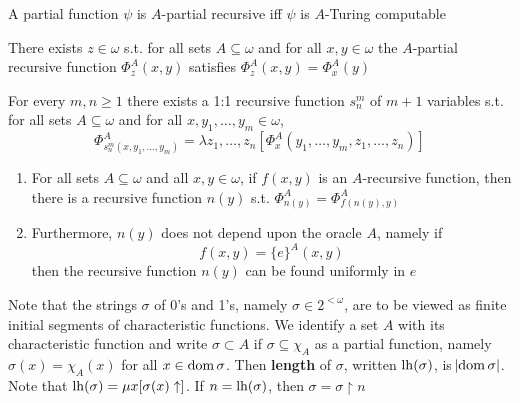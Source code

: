 \documentclass[11pt]{article}
\begin{document}
\begin{theorem}[]
A partial function \(\psi\) is \(A\)-partial recursive iff \(\psi\) is \(A\)-Turing computable
\end{theorem}

\begin{theorem}
There exists \(z\in\omega\) s.t. for all sets \(A\subseteq\omega\) and for
all \(x,y\in\omega\) the \(A\)-partial recursive function \(\Phi_z^A(x,y)\)
satisfies \(\Phi_z^A(x,y)=\Phi_x^A(y)\)
\end{theorem}

\begin{theorem}
For every \(m,n\ge1\) there exists a 1:1 recursive function \(s_n^m\) of
\(m+1\) variables s.t. for all sets \(A\subseteq\omega\) and for all
\(x,y_1,\dots,y_m\in\omega\),
\begin{equation*}
\Phi_{s^m_n(x,y_1,\dots,y_m)}^A=\lambda z_1,\dots,z_n[
\Phi_x^A(y_1,\dots,y_m,z_1,\dots,z_n)]
\end{equation*}
\end{theorem}

\begin{theorem}
\begin{enumerate}
\item For all sets \(A\subseteq\omega\) and all \(x,y\in\omega\), if \(f(x,y)\)
is an \(A\)-recursive function, then there is a recursive function
\(n(y)\) s.t. \(\Phi_{n(y)}^A=\Phi_{f(n(y),y)}^A\)
\item Furthermore, \(n(y)\) does not depend upon the oracle \(A\), namely if
\begin{equation*}
f(x,y)=\{e\}^A(x,y)
\end{equation*}
then the recursive function \(n(y)\) can be found uniformly in \(e\)
\end{enumerate}
\end{theorem}

Note that the strings \(\sigma\) of 0's and 1's, namely \(\sigma\in2^{<\omega}\),
are to be viewed as finite initial segments of characteristic functions. We
identify a set \(A\) with its characteristic function and write
\(\sigma\subset A\) if \(\sigma\subseteq\chi_A\) as a partial function,
namely \(\sigma(x)=\chi_A(x)\) for all \(x\in\operatorname{dom}\sigma\). Then \textbf{length} of
\(\sigma\), written \(\operatorname{lh}(\sigma)\), is \(\abs{\operatorname{dom}\sigma}\). Note that
\(\operatorname{lh}(\sigma)=\mu x[\sigma(x)\uparrow]\). If \(n=\operatorname{lh}(\sigma)\), then
\(\sigma=\sigma\restriction n\)
\end{document}
